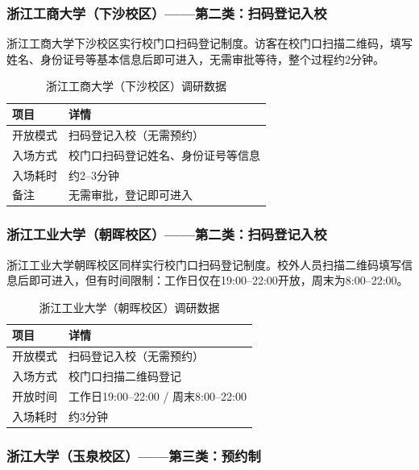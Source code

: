 \documentclass[12pt]{article}
\begin{document}
\subsubsection{浙江工商大学（下沙校区）——第二类：扫码登记入校}

浙江工商大学下沙校区实行校门口扫码登记制度。访客在校门口扫描二维码，填写姓名、身份证号等基本信息后即可进入，无需审批等待，整个过程约2分钟。

\begin{table}[H]
\centering
\caption{浙江工商大学（下沙校区）调研数据}
\label{tab:zjgsu}
\begin{tabular}{p{3cm}p{7.5cm}}
\toprule
\textbf{项目} & \textbf{详情} \\
\midrule
开放模式 & 扫码登记入校（无需预约） \\
入场方式 & 校门口扫码登记姓名、身份证号等信息 \\
入场耗时 & 约2–3分钟 \\
备注 & 无需审批，登记即可进入 \\
\bottomrule
\end{tabular}
\end{table}

\subsubsection{浙江工业大学（朝晖校区）——第二类：扫码登记入校}

浙江工业大学朝晖校区同样实行校门口扫码登记制度。校外人员扫描二维码填写信息后即可进入，但有时间限制：工作日仅在19:00–22:00开放，周末为8:00–22:00。

\begin{table}[H]
\centering
\caption{浙江工业大学（朝晖校区）调研数据}
\label{tab:zjut}
\begin{tabular}{p{3cm}p{7.5cm}}
\toprule
\textbf{项目} & \textbf{详情} \\
\midrule
开放模式 & 扫码登记入校（无需预约） \\
入场方式 & 校门口扫描二维码登记 \\
开放时间 & 工作日19:00–22:00 / 周末8:00–22:00 \\
入场耗时 & 约3分钟 \\
\bottomrule
\end{tabular}
\end{table}

\subsubsection{浙江大学（玉泉校区）——第三类：预约制}
\end{document}
